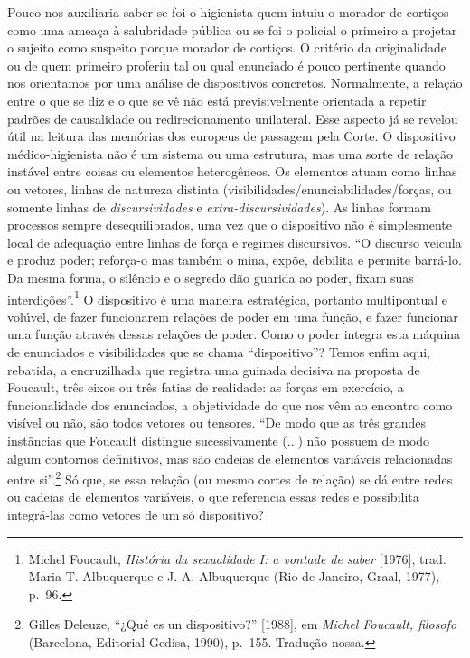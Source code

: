 Pouco nos auxiliaria saber se foi o higienista quem intuiu o morador de
cortiços como uma ameaça à salubridade pública ou se foi o policial o
primeiro a projetar o sujeito como suspeito porque morador de cortiços.
O critério da originalidade ou de quem primeiro proferiu tal ou qual
enunciado é pouco pertinente quando nos orientamos por uma análise de
dispositivos concretos. Normalmente, a relação entre o que se diz e o
que se vê não está previsivelmente orientada a repetir padrões de
causalidade ou redirecionamento unilateral. Esse aspecto já se revelou
útil na leitura das memórias dos europeus de passagem pela Corte. O
dispositivo médico-higienista não é um sistema ou uma estrutura, mas uma
sorte de relação instável entre coisas ou elementos heterogêneos. Os
elementos atuam como linhas ou vetores, linhas de natureza distinta
(visibilidades/enunciabilidades/forças, ou somente linhas de
\emph{discursividades} e \emph{extra-discursividades}). As linhas formam
processos sempre desequilibrados, uma vez que o dispositivo não é
simplesmente local de adequação entre linhas de força e regimes
discursivos. ``O discurso veicula e produz poder; reforça-o mas também o
mina, expõe, debilita e permite barrá-lo. Da mesma forma, o silêncio e o
segredo dão guarida ao poder, fixam suas interdições''.\footnote{Michel
  Foucault, \emph{História da sexualidade I: a vontade de saber}
  {[}1976{]}, trad. Maria T. Albuquerque e J. A. Albuquerque (Rio de
  Janeiro, Graal, 1977), p.~96.} O dispositivo é uma maneira
estratégica, portanto multipontual e volúvel, de fazer funcionarem
relações de poder em uma função, e fazer funcionar uma função através
dessas relações de poder. Como o poder integra esta máquina de
enunciados e visibilidades que se chama ``dispositivo''? Temos enfim
aqui, rebatida, a encruzilhada que registra uma guinada decisiva na
proposta de Foucault, três eixos ou três fatias de realidade: as forças
em exercício, a funcionalidade dos enunciados, a objetividade do que nos
vêm ao encontro como visível ou não, são todos vetores ou tensores. ``De
modo que as três grandes instâncias que Foucault distingue
sucessivamente (...) não possuem de modo algum contornos definitivos,
mas são cadeias de elementos variáveis relacionadas entre
si''.\footnote{Gilles Deleuze, ``¿Qué es un dispositivo?'' {[}1988{]},
  em \emph{Michel Foucault, filosofo} (Barcelona, Editorial Gedisa,
  1990), p.~155. Tradução nossa.} Só que, se essa relação (ou mesmo
cortes de relação) se dá entre redes ou cadeias de elementos variáveis,
o que referencia essas redes e possibilita integrá-las como vetores de
um só dispositivo?

